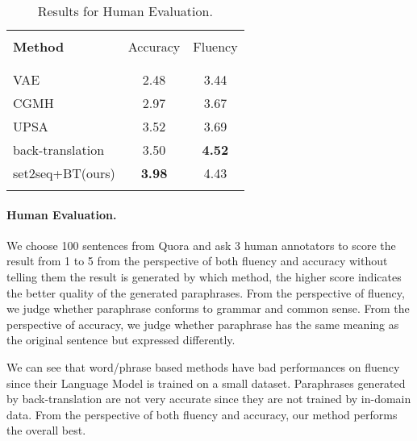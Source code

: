 \begin{table}[th]
\small
\centering
\begin{tabular}{lcc}
\hline 
\\ [-1.8ex]
\textbf{Method} & Accuracy & Fluency \\
\\ [-1.8ex]
\hline
\\ [-1.8ex]
VAE & 2.48 & 3.44 \\
CGMH & 2.97 & 3.67 \\
UPSA & 3.52 & 3.69 \\
back-translation & 3.50 & \textbf{4.52}\\
set2seq+BT\scriptsize{(ours)} & \textbf{3.98} & 4.43 \\
\\ [-1.8ex]
\hline
\end{tabular}
\caption{\label{tab:human} Results for Human Evaluation. }
\end{table}

\paragraph{Human Evaluation.}
We choose 100 sentences from Quora and ask 3 human annotators to score the result from 1 to 5 from the perspective of both fluency and accuracy without telling them the result is generated by which method, the higher score indicates the better quality of the generated paraphrases. From the perspective of fluency, we judge whether paraphrase conforms to grammar and common sense. From the perspective of accuracy, we judge whether paraphrase has the same meaning as the original sentence but expressed differently.


We can see that word/phrase based methods have bad performances on fluency since their Language Model is trained on a small dataset. Paraphrases generated by back-translation are not very accurate since they are not trained by in-domain data. From the perspective of both fluency and accuracy, our method performs 
the overall best.
